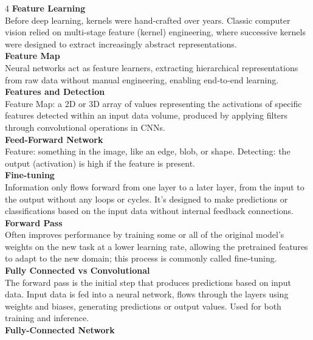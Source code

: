 \documentclass[8pt]{extarticle}
\begin{document}
\begin{multicols}{4}
\vspace{2pt}\textbf{Feature Learning}\\
Before deep learning, kernels were hand‑crafted over years. Classic computer vision relied on multi‑stage feature (kernel) engineering, where successive kernels were designed to extract increasingly abstract representations.\\
\vspace{2pt}\textbf{Feature Map}\\
Neural networks act as feature learners, extracting hierarchical representations from raw data without manual engineering, enabling end‑to‑end learning.\\
\vspace{2pt}\textbf{Features and Detection}\\
Feature Map: a 2D or 3D array of values representing the activations of specific features detected within an input data volume, produced by applying filters through convolutional operations in CNNs.\\
\vspace{2pt}\textbf{Feed-Forward Network}\\
Feature: something in the image, like an edge, blob, or shape. Detecting: the output (activation) is high if the feature is present.\\
\vspace{2pt}\textbf{Fine-tuning}\\
Information only flows forward from one layer to a later layer, from the input to the output without any loops or cycles. It’s designed to make predictions or classifications based on the input data without internal feedback connections.\\
\vspace{2pt}\textbf{Forward Pass}\\
Often improves performance by training some or all of the original model’s weights on the new task at a lower learning rate, allowing the pretrained features to adapt to the new domain; this process is commonly called fine‑tuning.\\
\vspace{2pt}\textbf{Fully Connected vs Convolutional}\\
The forward pass is the initial step that produces predictions based on input data. Input data is fed into a neural network, flows through the layers using weights and biases, generating predictions or output values. Used for both training and inference.\\
\vspace{2pt}\textbf{Fully-Connected Network}\\

\end{multicols}
\end{document}
